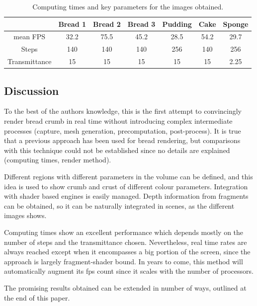 \documentclass[oneside,a4paper,spanish,links]{amca}
\begin{document}
\begin{table}[htb]
\centering
\begin{tabular}{|c|c|c|c|c|c|c|}
\hline &  Bread 1 & Bread 2 & Bread 3 & Pudding & Cake & Sponge \\
\hline
\hline
 mean FPS  & 32.2 &  75.5 &  45.2 & 28.5 &  54.2 & 29.7\\
\hline
 Steps &  140 &  140 &  140 & 256 &  140 & 256 \\
\hline
 Transmittance &  15 &  15 &  15 & 15 &  15 & 2.25 \\
\hline
\end{tabular}
\caption{Computing times and key parameters for the images obtained. }
\label{tab:n1}
\end{table}

\subsection{Discussion}
To the best of the authors knowledge, this is the first attempt to convincingly render bread crumb in real time without introducing complex intermediate processes (capture, mesh generation, precomputation, post-process). It is true that a previous approach \citep{Cho2007} has been used for bread rendering, but comparisons with this technique could not be established since no details are explained (computing times, render method).

Different regions with different parameters in the volume can be
defined, and this idea is used to show crumb and crust of different
colour parameters. 
Integration with shader based engines is easily managed. Depth
information from fragments can be obtained, so it can be naturally
integrated in scenes, as the different images shows.

Computing times show an excellent performance which depends mostly on
the number of steps and the transmittance chosen. Nevertheless, real
time rates are always reached except when it encompasses a big portion
of the screen, since the approach is largely fragment-shader bound. In
years to come, this method will automatically augment its fps count
since it scales with the number of processors.

The promising results obtained can be extended in number of ways,
outlined at the end of this paper.


\end{document}
